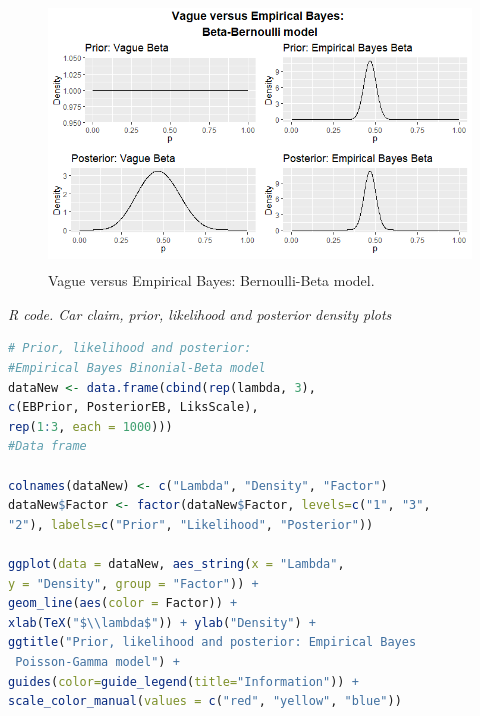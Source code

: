 \begin{enumerate}[leftmargin=*]
\begin{figure}[!h]
	\includegraphics[width=340pt, height=200pt]{Chapters/chapter1/figures/BerBeta.png}
	\caption[List of figure caption goes here]{Vague versus Empirical Bayes: Bernoulli-Beta model.}\label{fig11}
\end{figure}

\begin{tcolorbox}[enhanced,width=4.67in,center upper,
fontupper=\large\bfseries,drop shadow southwest,sharp corners]
\textit{R code. Car claim, prior, likelihood and posterior density plots}
\begin{VF}
\begin{lstlisting}[basicstyle=\scriptsize, language=R]
# Prior, likelihood and posterior: 
#Empirical Bayes Binonial-Beta model
dataNew <- data.frame(cbind(rep(lambda, 3), 
c(EBPrior, PosteriorEB, LiksScale),
rep(1:3, each = 1000))) 
#Data frame

colnames(dataNew) <- c("Lambda", "Density", "Factor")
dataNew$Factor <- factor(dataNew$Factor, levels=c("1", "3", 
"2"), labels=c("Prior", "Likelihood", "Posterior"))

ggplot(data = dataNew, aes_string(x = "Lambda", 
y = "Density", group = "Factor")) + 
geom_line(aes(color = Factor)) +
xlab(TeX("$\\lambda$")) + ylab("Density") +
ggtitle("Prior, likelihood and posterior: Empirical Bayes
 Poisson-Gamma model") +
guides(color=guide_legend(title="Information")) +
scale_color_manual(values = c("red", "yellow", "blue"))

\end{lstlisting}
\end{VF}
\end{tcolorbox}


\end{enumerate}
